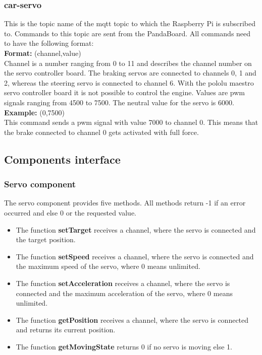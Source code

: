 \subsubsection{car-servo}
This is the topic name of the mqtt topic to which the Raspberry Pi is subscribed to. Commands to this topic are sent from the PandaBoard. All commands need to have the following format: \\ 

\textbf{Format:} (channel,value) \\
Channel is a number ranging from 0 to 11 and describes the channel number on the servo controller board. The braking servos are connected to channels 0, 1 and 2, whereas the steering servo is connected to channel 6. With the pololu maestro servo controller board it is not possible to control the engine. Values are pwm signals ranging from 4500 to 7500. The neutral value for the servo is 6000. \\

\textbf{Example:} (0,7500) \\
This command sends a pwm signal with value 7000 to channel 0. This means that the brake connected to channel 0 gets activated with full force. 

\subsection{Components interface}
\label{sec:comp}


\subsubsection{Servo component}
\label{sec:comp-servo}

The servo component provides five methods. All methods return -1 if an error occurred and else 0 or the requested value.
\begin{itemize}
\item The function \textbf{setTarget} receives a channel, where the servo is connected and the target position.
\item The function \textbf{setSpeed} receives a channel, where the servo is connected and the maximum speed of the servo, where 0 means unlimited.
\item The function \textbf{setAcceleration} receives a channel, where the servo is connected and the maximum acceleration of the servo, where 0 means unlimited.
\item The function \textbf{getPosition} receives a channel, where the servo is connected and returns its current position.
\item The function \textbf{getMovingState} returns 0 if no servo is moving else 1.
\end{itemize}


